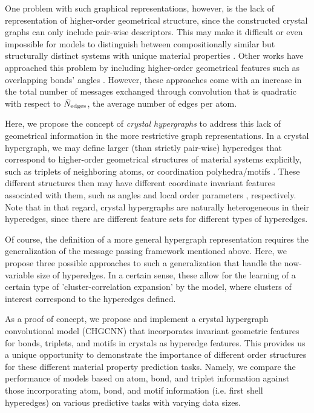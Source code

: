 \documentclass[twoside,twocolumn,9pt]{article}
\begin{document}
One problem with such graphical representations, however, is the lack of representation of higher-order geometrical structure, since the constructed crystal graphs can only include pair-wise descriptors. This may make it difficult or even impossible for models to distinguish between compositionally similar but structurally distinct systems with unique material properties \cite{congn}. Other works have approached this problem by including higher-order geometrical features such as overlapping bonds' angles \cite{alignn,m3gnet,congn}. However, these approaches come with an increase in the total number of messages exchanged through convolution that is quadratic with respect to $\Bar{N}_{\text{edges}}$, the average number of edges per atom.

Here, we propose the concept of \textit{crystal hypergraphs} to address this lack of geometrical information in the more restrictive graph representations. In a crystal hypergraph, we may define larger (than strictly pair-wise) hyperedges that correspond to higher-order geometrical structures of material systems explicitly, such as triplets of neighboring atoms, or coordination polyhedra/motifs \cite{paulings_rules, coordpolyshapes, motifstats, motifexplore, clustermotifsanal, motife3nn}. These different structures then may have different coordinate invariant features associated with them, such as angles and local order parameters \cite{orderparam1, orderparam2, molorderparam}, respectively. Note that in that regard, crystal hypergraphs are naturally heterogeneous in their hyperedges, since there are different feature sets for different types of hyperedges.

Of course, the definition of a more general hypergraph representation requires the generalization of the message passing framework mentioned above. Here, we propose three possible approaches to such a generalization that handle the now-variable size of hyperedges. In a certain sense, these allow for the learning of a certain type of 'cluster-correlation expansion' \cite{clease, cce_crys, cce_gen} by the model, where clusters of interest correspond to the hyperedges defined.

As a proof of concept, we propose and implement a crystal hypergraph convolutional model (CHGCNN) that incorporates invariant geometric features for bonds, triplets, and motifs in crystals as hyperedge features. This provides us a unique opportunity to demonstrate the importance of different order structures for these different material property prediction tasks. Namely, we compare the performance of models based on atom, bond, and triplet information against those incorporating atom, bond, and motif information (i.e. first shell hyperedges) on various predictive tasks with varying data sizes.
\end{document}
